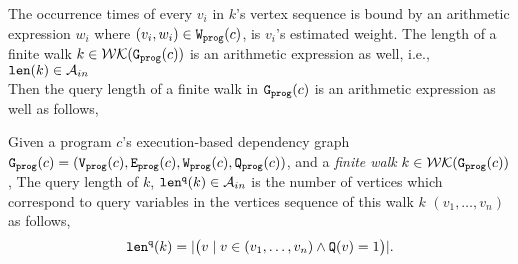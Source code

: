 {The occurrence times of every $v_i $ in $k$'s vertex sequence is bound by 
an arithmetic expression $w_i$ where $(v_i, w_i) \in \mathtt{{W_{prog}}}(c)$, is $v_i$'s estimated weight. 
The length of a finite walk $k \in \mathcal{WK}(\mathtt{{G_{prog}}}(c))$ is an arithmetic expression
as well, i.e., $\mathtt{len}(k) \in \mathcal{A}_{in}$
\\
Then the query length of a finite walk in  $\mathtt{{G_{prog}}}(c)$ is an arithmetic expression as well as follows,
\begin{defn}
\label{def:static-qlen}
Given 
a program $c$'s execution-based dependency graph 
$\mathtt{{G_{prog}}}({c}) = (\mathtt{{V_{prog}}}(c), \mathtt{{E_{prog}}}(c), \mathtt{{W_{prog}}}(c), \mathtt{{Q_{prog}}}(c))$, 
  and a \emph{finite walk} $k \in \mathcal{WK}(\mathtt{{G_{prog}}}(c))$,
The query length of $k$, $\mathtt{len}^{\tt q}(k) \in \mathcal{A}_{in}$ 
is the number of vertices which correspond to query variables in the vertices sequence of this walk $k$
$(v_1, \ldots, v_{n})$ as follows, 
\[
  \mathtt{len}^{\tt q}(k) = |\big( v \mid v \in (v_1, \ldots, v_{n}) \land \mathtt{Q}(v) = 1 \big)|.
\]
\end{defn}
}
